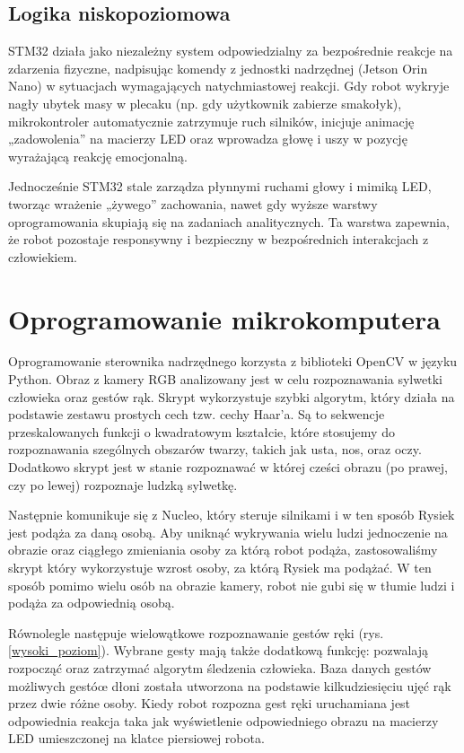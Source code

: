 \documentclass{article}
\begin{document}
        \subsection*{Logika niskopoziomowa}
            STM32 działa jako niezależny system odpowiedzialny za bezpośrednie reakcje na zdarzenia fizyczne,
            nadpisując komendy z jednostki nadrzędnej (Jetson Orin Nano) w sytuacjach wymagających natychmiastowej reakcji.
            Gdy robot wykryje nagły ubytek masy w plecaku (np. gdy użytkownik zabierze smakołyk),
            mikrokontroler automatycznie zatrzymuje ruch silników, inicjuje animację „zadowolenia” na macierzy LED
            oraz wprowadza głowę i uszy w pozycję wyrażającą reakcję emocjonalną.

            Jednocześnie STM32 stale zarządza płynnymi ruchami głowy i mimiką LED, tworząc wrażenie „żywego” zachowania,
            nawet gdy wyższe warstwy oprogramowania skupiają się na zadaniach analitycznych.
            Ta warstwa zapewnia, że robot pozostaje responsywny i bezpieczny w bezpośrednich interakcjach z człowiekiem.

    \pagebreak
    \section{Oprogramowanie mikrokomputera}
        Oprogramowanie sterownika nadrzędnego korzysta z biblioteki OpenCV w języku Python.
        Obraz z kamery RGB analizowany jest w celu rozpoznawania sylwetki człowieka oraz gestów rąk.
        Skrypt wykorzystuje szybki algorytm, który działa na podstawie zestawu prostych cech tzw. cechy Haar'a.
        Są to sekwencje przeskalowanych funkcji o kwadratowym kształcie, które stosujemy do rozpoznawania szególnych obszarów twarzy, takich jak usta, nos, oraz oczy.
        Dodatkowo skrypt jest w stanie rozpoznawać w której cześci obrazu (po prawej, czy po lewej) rozpoznaje ludzką sylwetkę.

        Następnie komunikuje się z Nucleo, który steruje silnikami i w ten sposób Rysiek jest podąża za daną osobą.
        Aby uniknąć wykrywania wielu ludzi jednoczenie na obrazie oraz ciągłego zmieniania osoby za którą robot podąża,
        zastosowaliśmy skrypt który wykorzystuje wzrost osoby, za którą Rysiek ma podążać.
        W ten sposób pomimo wielu osób na obrazie kamery, robot nie gubi się w tłumie ludzi i podąża za odpowiednią osobą.

        Równolegle następuje wielowątkowe rozpoznawanie gestów ręki (rys. \ref{wysoki_poziom}).
        Wybrane gesty mają także dodatkową funkcję: pozwalają rozpocząć oraz zatrzymać algorytm śledzenia człowieka.
        Baza danych gestów możliwych gestóœ dłoni została utworzona na podstawie kilkudziesięciu ujęć rąk przez dwie różne osoby.
        Kiedy robot rozpozna gest ręki uruchamiana jest odpowiednia reakcja taka jak wyświetlenie odpowiedniego obrazu na macierzy LED umieszczonej na klatce piersiowej robota.
\end{document}
